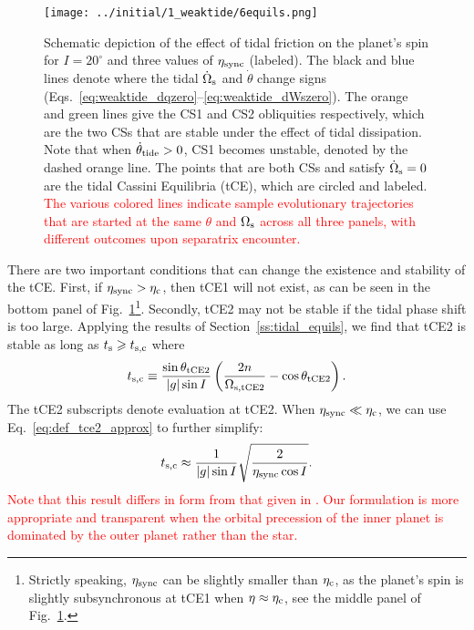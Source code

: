 \documentclass[
        fleqn,
        usenatbib,
    ]{mnras}
\newcommand*{\abs}[1]{\left|#1\right|}
\newcommand*{\p}[1]{\left(#1\right)}
\begin{document}
\begin{figure}
    \centering
    \texttt{[image: ../initial/1\_weaktide/6equils.png]}
    \caption{Schematic depiction of the effect of tidal friction on the planet's
    spin for $I = 20^\circ$ and three values of $\eta_{\rm sync}$ (labeled). The
    black and blue lines denote where the tidal $\dot{\Omega}_{\rm s}$ and
    $\dot{\theta}$ change signs
    (Eqs.~\ref{eq:weaktide_dqzero}--\ref{eq:weaktide_dWszero}). The orange and
    green lines give the CS1 and CS2 obliquities respectively, which are the two
    CSs that are stable under the effect of tidal dissipation. Note that when
    $\dot{\theta}_{\rm tide} > 0$, CS1 becomes unstable, denoted by the dashed
    orange line. The points that are both CSs and satisfy $\dot{\Omega}_{\rm s}
    = 0$ are the tidal Cassini Equilibria (tCE), which are circled and labeled.
    \textcolor{red}{The various colored lines indicate sample evolutionary
    trajectories that are started at the same $\theta$ and $\Omega_{\rm s}$
    across all three panels, with different outcomes upon separatrix encounter.}
    }\label{fig:6equils}
\end{figure}

There are two important conditions that can change the existence and stability
of the tCE\@. First, if $\eta_{\rm sync} > \eta_{\rm c}$, then tCE1 will not
exist, as can be seen in the bottom panel of
Fig.~\ref{fig:6equils}\footnote{Strictly speaking, $\eta_{\rm sync}$ can be
slightly smaller than $\eta_{\rm c}$, as the planet's spin is slightly
subsynchronous at tCE1 when $\eta \approx \eta_{\rm c}$, see the middle panel of
Fig.~\ref{fig:6equils}.}. Secondly, tCE2 may not be stable if the tidal phase
shift is too large. Applying the results of Section~\ref{ss:tidal_equils}, we
find that tCE2 is stable as long as $t_{\rm s} \geq t_{\rm s, c}$ where
\begin{equation}
    t_{\rm s, c} \equiv \frac{\sin \theta_{\rm tCE2}}{\abs{g} \sin
            I}\p{\frac{2n}{\Omega_{\rm s, tCE2}} - \cos \theta_{\rm tCE2}}.
\end{equation}
The tCE2 subscripts denote evaluation at tCE2. When $\eta_{\rm sync} \ll
\eta_{\rm c}$, we can use Eq.~\eqref{eq:def_tce2_approx} to further simplify:
\begin{equation}
    t_{\rm s, c}\approx \frac{1}{\abs{g}\sin I}\sqrt{\frac{2}{\eta_{\rm sync}
        \cos I}}. \label{eq:def_ts_crit}
\end{equation}
\textcolor{red}{Note that this result differs in form from that given in
\citet{fabrycky_otides}. Our formulation is more appropriate and transparent
when the orbital precession of the inner planet is dominated by the outer planet
rather than the star.}
\end{document}
